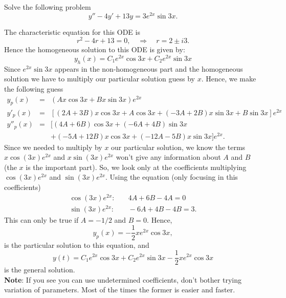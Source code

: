 \documentclass[11pt]{article}
\begin{document}
\begin{problem}
Solve the following problem
\begin{equation*}
     y''-4y'+13y=3e^{2x}\sin 3x.
\end{equation*}
\end{problem}
\begin{solution}
The characteristic equation for this ODE is 
\begin{equation}
r^2 -4r +13 =0, \quad  \Rightarrow \quad r= 2 \pm i 3.
\end{equation}
Hence the homogeneous solution to this ODE is given by:
\begin{equation}
y_{h}(x) = C_{1} e^{2 x} \cos 3x  + C_{2} e^{2x}\sin 3x
\end{equation}
Since $e^{2x}\sin 3x$ appears in the non-homogeneous part and the homogeneous solution we have to multiply our particular solution guess by $x$. Hence, we make the following guess
\begin{eqnarray*}
y_{p}(x) & = & (Ax\cos3x+Bx\sin3x)e^{2x} \\
y'_{p}(x) & = & [(2A+3B)x\cos 3x + A\cos3x+(-3A +2B)x \sin 3x + B\sin3x]e^{2x} \\
y''_{p}(x) & = & [(4A+6B)\cos3x+(-6A+4B)\sin 3x \\ & & + (-5A+12B)x\cos 3x + (-12A -5B)x \sin 3x]e^{2x}.
\end{eqnarray*}
Since we needed to multiply by $x$ our particular solution, we know the terms $x\cos (3x) e^{2x}$ and $x\sin (3x) e^{2x}$ won't give any information about $A$ and $B$ (the $x$ is the important part). So, we look only at the coefficients multiplying $\cos(3x)e^{2x}$ and $\sin(3x)e^{2x}$. Using the equation (only focusing in this coefficients)
\begin{equation*} \begin{split}
\cos(3x)e^{2x}:& \quad  4A +6B -4A = 0 \\
\sin(3x)e^{2x}:& \quad  -6A +4B -4B = 3.
\end{split}
\end{equation*}
This can only be true if $A = -1/2$ and $B=0$. Hence, 
$$y_{p}(x) = -\frac{1}{2}xe^{2x}\cos3x,$$ 
is the particular solution to this equation, and
\[\boxed{y(t) = C_{1} e^{2 x} \cos 3x  + C_{2} e^{2x}\sin 3x -\frac{1}{2}xe^{2x}\cos3x}\]
is the general solution. \\
\textbf{Note}: If you see you can use undetermined coefficients, don't bother trying variation of parameters. Most of the times the former is easier and faster. 
\end{solution}
\end{document}
